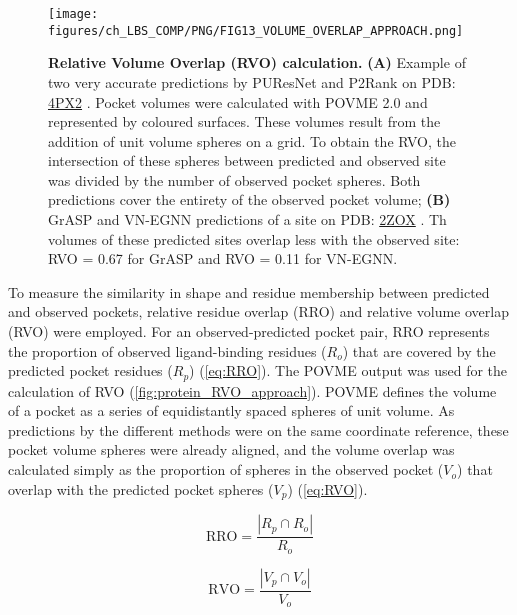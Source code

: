 \begin{figure}[htbp!]
    \centering
    \texttt{[image: figures/ch\_LBS\_COMP/PNG/FIG13\_VOLUME\_OVERLAP\_APPROACH.png]}
    \caption[Relative Volume Overlap (RVO) calculation]{\textbf{Relative Volume Overlap (RVO) calculation.} \textbf{(A)} Example of two very accurate predictions by PUResNet and P2Rank on PDB: \href{https://www.ebi.ac.uk/pdbe/entry/pdb/4px2}{4PX2} \cite{PDB_4PX2}. Pocket volumes were calculated with POVME 2.0 and represented by coloured surfaces. These volumes result from the addition of unit volume spheres on a grid. To obtain the RVO, the intersection of these spheres between predicted and observed site was divided by the number of observed pocket spheres. Both predictions cover the entirety of the observed pocket volume; \textbf{(B)} GrASP and VN-EGNN predictions of a site on PDB: \href{https://www.ebi.ac.uk/pdbe/entry/pdb/2ZOX}{2ZOX} \cite{NOGUCHI_2008_STRUCTURE}. Th volumes of these predicted sites overlap less with the observed site: RVO = 0.67 for GrASP and RVO = 0.11 for VN-EGNN.}
    \label{fig:protein_RVO_approach}
\end{figure}

\FloatBarrier

To measure the similarity in shape and residue membership between predicted and observed pockets, relative residue overlap (RRO) and relative volume overlap (RVO) were employed. For an observed-predicted pocket pair, RRO represents the proportion of observed ligand-binding residues ($R_{o}$) that are covered by the predicted pocket residues ($R_{p}$) (\autoref{eq:RRO}). The POVME output was used for the calculation of RVO (\autoref{fig:protein_RVO_approach}). POVME defines the volume of a pocket as a series of equidistantly spaced spheres of unit volume. As predictions by the different methods were on the same coordinate reference, these pocket volume spheres were already aligned, and the volume overlap was calculated simply as the proportion of spheres in the observed pocket ($V_{o}$) that overlap with the predicted pocket spheres ($V_{p}$) (\autoref{eq:RVO}).

\begin{equation}
\text{RRO} = \frac{|R_p \cap R_o|}{R_o}
\label{eq:RRO}
\end{equation}

\begin{equation}
\text{RVO} = \frac{|V_p \cap V_o|}{V_o}
\label{eq:RVO}
\end{equation}

